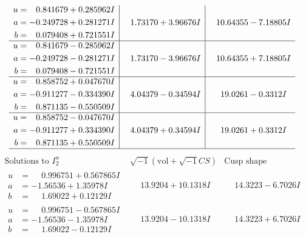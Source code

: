 \documentclass[1p]{elsarticle_modified}
\theoremstyle{definition}
\newcommand{\I}{\sqrt{-1}}
\begin{document}
$$\begin{array}{c|c|c}
\begin{aligned}
u &= \phantom{-}0.841679 + 0.285962 I \\
a &= -0.249728 + 0.281271 I \\
b &= \phantom{-}0.079408 + 0.721551 I\end{aligned}
 & \phantom{-}1.73170 + 3.96676 I & \phantom{-}10.64355 - 7.18805 I \\ \hline\begin{aligned}
u &= \phantom{-}0.841679 - 0.285962 I \\
a &= -0.249728 - 0.281271 I \\
b &= \phantom{-}0.079408 - 0.721551 I\end{aligned}
 & \phantom{-}1.73170 - 3.96676 I & \phantom{-}10.64355 + 7.18805 I \\ \hline\begin{aligned}
u &= \phantom{-}0.858752 + 0.047670 I \\
a &= -0.911277 - 0.334390 I \\
b &= \phantom{-}0.871135 - 0.550509 I\end{aligned}
 & \phantom{-}4.04379 - 0.34594 I & \phantom{-}19.0261 - 0.3312 I \\ \hline\begin{aligned}
u &= \phantom{-}0.858752 - 0.047670 I \\
a &= -0.911277 + 0.334390 I \\
b &= \phantom{-}0.871135 + 0.550509 I\end{aligned}
 & \phantom{-}4.04379 + 0.34594 I & \phantom{-}19.0261 + 0.3312 I\\
 \hline 
 \end{array}$$\newpage$$\begin{array}{c|c|c}  
\text{Solutions to }I^u_{2}& \I (\text{vol} + \sqrt{-1}CS) & \text{Cusp shape}\\
 \hline 
\begin{aligned}
u &= \phantom{-}0.996751 + 0.567865 I \\
a &= -1.56536 + 1.35978 I \\
b &= \phantom{-}1.69022 + 0.12129 I\end{aligned}
 & \phantom{-}13.9204 + 10.1318 I & \phantom{-}14.3223 - 6.7026 I \\ \hline\begin{aligned}
u &= \phantom{-}0.996751 - 0.567865 I \\
a &= -1.56536 - 1.35978 I \\
b &= \phantom{-}1.69022 - 0.12129 I\end{aligned}
 & \phantom{-}13.9204 - 10.1318 I & \phantom{-}14.3223 + 6.7026 I \\ \hline\begin{aligned}

\end{aligned}
\end{array}$$
\end{document}
